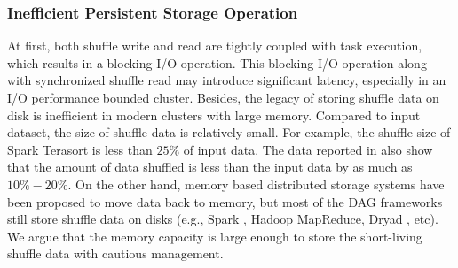 \subsubsection{Inefficient Persistent Storage Operation}
At first, both shuffle write and read are tightly coupled with task execution, which results in a blocking I/O operation. 
This blocking I/O operation along with synchronized shuffle read may introduce significant latency, especially in an I/O performance bounded cluster.
Besides, the legacy of storing shuffle data on disk is inefficient in modern clusters with large memory. 
Compared to input dataset, the size of shuffle data is relatively small. 
For example, the shuffle size of Spark Terasort is less than $25\%$ of input data. 
The data reported in \cite{makingsense} also show that the amount of data shuffled is less than the input data by as much as $10\%-20\%$. 
On the other hand, memory based distributed storage systems have been proposed \cite{memcached, tachyon, ramcloud} to move data back to memory, 
but most of the DAG frameworks still store shuffle data on disks (e.g., Spark \cite{apachespark}, Hadoop MapReduce, Dryad \cite{dryad}, etc).
We argue that the memory capacity is large enough to store the short-living shuffle data with cautious management.

